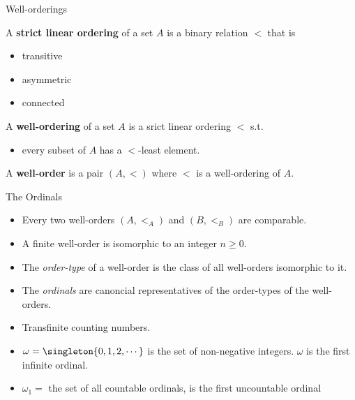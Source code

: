 \begin{frame}{Well-orderings}

\begin{definition}
A \textbf{strict linear ordering} of a set $A$ is a binary relation $<$ that is

\begin{itemize}
  \item transitive
  \item asymmetric
  \item connected
\end{itemize}

\end{definition}

\begin{definition}
A \textbf{well-ordering} of a set $A$ is a srict linear ordering $<$ s.t.

\begin{itemize}
  \item every subset of $A$ has a $<$-least element.
\end{itemize}

\end{definition}

\begin{definition}
A \textbf{well-order} is a pair $(A, <)$ where $<$ is a well-ordering of $A$.
\end{definition}

\end{frame}

\begin{frame}{The Ordinals}

\begin{itemize}
  \item  Every two well-orders $(A, <_A)$ and $(B, <_B)$ are comparable.
  \item  A finite well-order is isomorphic to an integer $n\geq 0$.
  \item The \emph{order-type} of a well-order is the class of all well-orders
  isomorphic to it.
  \item The \emph{ordinals} are canoncial representatives of the
    order-types of the well-orders.
  \item Transfinite counting numbers.
  \item $\omega = \singleton{0, 1, 2, \cdots }$ is the set of non-negative
    integers. $\omega$ is the first infinite ordinal.
  \item  $\omega_1 = $ the set of all countable ordinals, is the first
    uncountable ordinal
\end{itemize}

\end{frame}

